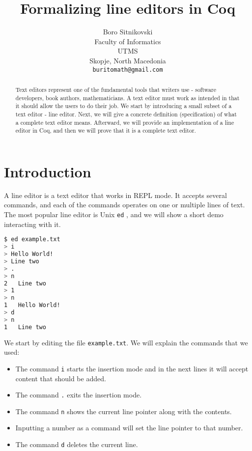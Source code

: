 \documentclass{article}
\title{Formalizing line editors in Coq}
\author{
  Boro Sitnikovski \\
  Faculty of Informatics\\
  UTMS\\
  Skopje, North Macedonia \\
  \texttt{buritomath@gmail.com} \\
}
\theoremstyle{definition}
\begin{document}
\maketitle

\begin{abstract}
Text editors represent one of the fundamental tools that writers use - software developers, book authors, mathematicians. A text editor must work as intended in that it should allow the users to do their job. We start by introducing a small subset of a text editor - line editor. Next, we will give a concrete definition (specification) of what a complete text editor means. Afterward, we will provide an implementation of a line editor in Coq, and then we will prove that it is a complete text editor.
\end{abstract}


\section{Introduction}

A line editor is a text editor that works in REPL mode. It accepts several commands, and each of the commands operates on one or multiple lines of text. The most popular line editor is Unix \texttt{ed} \cite{b1}, and we will show a short demo interacting with it.

\begin{lstlisting}[language=sh]
$ ed example.txt
> i
> Hello World!
> Line two
> .
> n
2	Line two
> 1
> n
1	Hello World!
> d
> n
1	Line two
\end{lstlisting}

We start by editing the file \texttt{example.txt}. We will explain the commands that we used:

\begin{itemize}
\item The command \texttt{i} starts the insertion mode and in the next lines it will accept content that should be added.
\item The command \texttt{.} exits the insertion mode.
\item The command \texttt{n} shows the current line pointer along with the contents.
\item Inputting a number as a command will set the line pointer to that number.
\item The command \texttt{d} deletes the current line.
\end{itemize}
\end{document}
